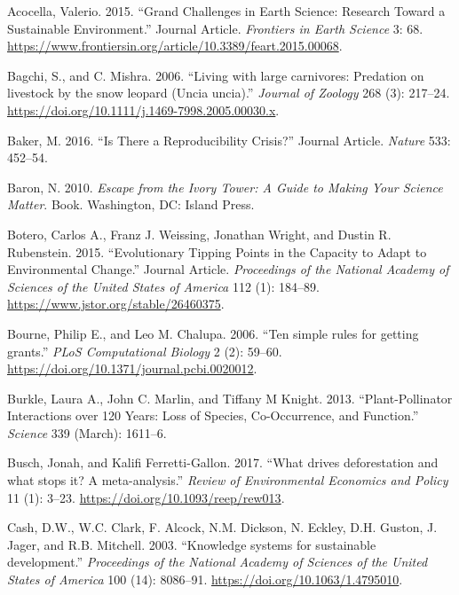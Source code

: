 \documentclass[fleqn,10pt]{wlpeerj} %
\begin{document}
\leavevmode\hypertarget{ref-Acocella2015}{}%
Acocella, Valerio. 2015. ``Grand Challenges in Earth Science: Research
Toward a Sustainable Environment.'' Journal Article. \emph{Frontiers in
Earth Science} 3: 68.
\url{https://www.frontiersin.org/article/10.3389/feart.2015.00068}.

\leavevmode\hypertarget{ref-Bagchi2006}{}%
Bagchi, S., and C. Mishra. 2006. ``Living with large carnivores:
Predation on livestock by the snow leopard (Uncia uncia).''
\emph{Journal of Zoology} 268 (3): 217--24.
\url{https://doi.org/10.1111/j.1469-7998.2005.00030.x}.

\leavevmode\hypertarget{ref-Baker2016}{}%
Baker, M. 2016. ``Is There a Reproducibility Crisis?'' Journal Article.
\emph{Nature} 533: 452--54.

\leavevmode\hypertarget{ref-Baron2010}{}%
Baron, N. 2010. \emph{Escape from the Ivory Tower: A Guide to Making
Your Science Matter}. Book. Washington, DC: Island Press.

\leavevmode\hypertarget{ref-Botero2015}{}%
Botero, Carlos A., Franz J. Weissing, Jonathan Wright, and Dustin R.
Rubenstein. 2015. ``Evolutionary Tipping Points in the Capacity to Adapt
to Environmental Change.'' Journal Article. \emph{Proceedings of the
National Academy of Sciences of the United States of America} 112 (1):
184--89. \url{https://www.jstor.org/stable/26460375}.

\leavevmode\hypertarget{ref-Bourne2006}{}%
Bourne, Philip E., and Leo M. Chalupa. 2006. ``Ten simple rules for
getting grants.'' \emph{PLoS Computational Biology} 2 (2): 59--60.
\url{https://doi.org/10.1371/journal.pcbi.0020012}.

\leavevmode\hypertarget{ref-Burkle2013}{}%
Burkle, Laura A., John C. Marlin, and Tiffany M Knight. 2013.
``Plant-Pollinator Interactions over 120 Years: Loss of Species,
Co-Occurrence, and Function.'' \emph{Science} 339 (March): 1611--6.

\leavevmode\hypertarget{ref-Busch2017}{}%
Busch, Jonah, and Kalifi Ferretti-Gallon. 2017. ``What drives
deforestation and what stops it? A meta-analysis.'' \emph{Review of
Environmental Economics and Policy} 11 (1): 3--23.
\url{https://doi.org/10.1093/reep/rew013}.

\leavevmode\hypertarget{ref-Cash2003}{}%
Cash, D.W., W.C. Clark, F. Alcock, N.M. Dickson, N. Eckley, D.H. Guston,
J. Jager, and R.B. Mitchell. 2003. ``Knowledge systems for sustainable
development.'' \emph{Proceedings of the National Academy of Sciences of
the United States of America} 100 (14): 8086--91.
\url{https://doi.org/10.1063/1.4795010}.
\end{document}
